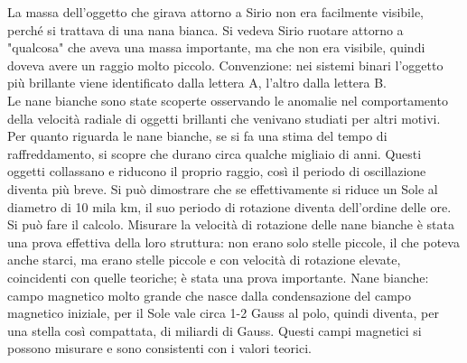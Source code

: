 \documentclass[a4paper,11pt]{article}
\begin{document}
La massa dell'oggetto che girava attorno a Sirio non era facilmente visibile, perché si trattava di una nana bianca. Si vedeva Sirio ruotare attorno a "qualcosa" che aveva una massa importante, ma che non era visibile, quindi doveva avere un raggio molto piccolo. Convenzione: nei sistemi binari l'oggetto più brillante viene identificato dalla lettera A, l'altro dalla lettera B.\\ Le nane bianche sono state scoperte osservando le anomalie nel comportamento della velocità radiale di oggetti brillanti che venivano studiati per altri motivi. Per quanto riguarda le nane bianche, se si fa una stima del tempo di raffreddamento, si scopre che durano circa qualche migliaio di anni. Questi oggetti collassano e riducono il proprio raggio, così il periodo di oscillazione diventa più breve. Si può dimostrare che se effettivamente si riduce un Sole al diametro di 10 mila km, il suo periodo di rotazione diventa dell'ordine delle ore. Si può fare il calcolo. Misurare la velocità di rotazione delle nane bianche è stata una prova effettiva della loro struttura: non erano solo stelle piccole, il che poteva anche starci, ma erano stelle piccole e con velocità di rotazione elevate, coincidenti con quelle teoriche; è stata una prova importante. Nane bianche: campo magnetico molto grande che nasce dalla condensazione del campo magnetico iniziale, per il Sole vale circa 1-2 Gauss al polo, quindi diventa, per una stella così compattata, di miliardi di Gauss. Questi campi magnetici si possono misurare e sono consistenti con i valori teorici. 
\end{document}
